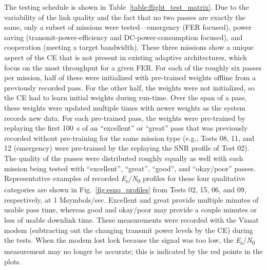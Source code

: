 \documentclass[journal]{IEEEtran}
\begin{document}
The testing schedule is shown in Table~\ref{table:flight_test_matrix}.  Due to the variability of the link quality and the fact that no two passes are exactly the same, only a subset of missions were tested---emergency (FER focused), power saving (transmit-power-efficiency and DC-power-consumption focused), and cooperation (meeting a target bandwidth).  These three missions show a unique aspect of the CE that is not present in existing adaptive architectures, which focus on the most throughput for a given FER.  For each of the roughly six passes per mission, half of these were initialized with pre-trained weights offline from a previously recorded pass.  For the other half, the weights were not initialized, so the CE had to learn initial weights during run-time.  Over the span of a pass, these weights were updated multiple times with newer weights as the system records new data.  For each pre-trained pass, the weights were pre-trained by replaying the first 100~s of an ``excellent'' or ``great'' pass that was previously recorded without pre-training for the same mission type (e.g., Tests 08, 11, and 12 (emergency) were pre-trained by the replaying the SNR profile of Test 02).    The quality of the passes were distributed roughly equally as well with each mission being tested with ``excellent'', ``great'', ``good'', and ``okay/poor'' passes.  Representative examples of recorded \textit{E}\textsubscript{s}/\textit{N}\textsubscript{0} profiles for these four qualitative categories are shown in Fig.~\ref{fig:esno_profiles} from Tests 02, 15, 06, and 09, respectively, at 1 Msymbols/sec.  Excellent and great provide multiple minutes of usable pass time, whereas good and okay/poor may provide a couple minutes or less of usable downlink time.  These measurements were recorded with the Viasat modem (subtracting out the changing transmit power levels by the CE) during the tests.  When the modem lost lock because the signal was too low, the \textit{E}\textsubscript{s}/\textit{N}\textsubscript{0} measurement may no longer be accurate; this is indicated by the red points in the plots.
\end{document}
